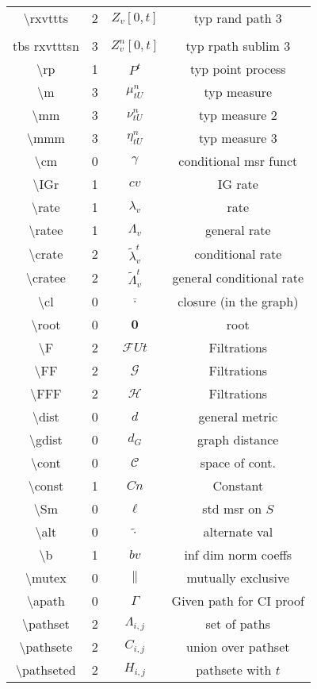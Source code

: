 \documentclass[12pt]{article}
\newcommand{\mc}{\mathcal}
\newcommand{\ov}{\overline}
\newcommand{\tbs}{\textbackslash}
\renewcommand{\root}{\mathbf{0}}				%
\renewcommand{\v}{v}							%
\renewcommand{\U}{U}							%
\renewcommand{\S}{S}							%
\renewcommand{\b}{b}							%
\renewcommand{\t}{t}							%
\newcommand{\F}{\mc{F}}							%
\newcommand{\FG}[2]{\mc{G}}						%
\newcommand{\FH}[2]{\mc{H}}						%
\newcommand{\IGr}{c}							%
\newcommand{\cl}{\ov}							%
\newcommand{\const}{C}							%
\newcommand{\gdist}{d_G}						%
\newcommand{\itt}{i}								%
\newcommand{\ittt}{j}								%
\newcommand{\rxvttts}[2]{Z_{#1}{#2}}				%
\newcommand{\rxvtttsn}[3]{Z_{#1}^{#3}{#2}}			%
\newcommand{\rp}[1]{P^{#1}}							%
\newcommand{\m}[3]{\mu_{#2#1}^{#3}}						%
\newcommand{\mm}[3]{\nu_{#2#1}^{#3}}						%
\newcommand{\mmm}[3]{\eta_{#2#1}^{#3}}						%
\newcommand{\cm}{\gamma}							%
\newcommand{\rate}[1]{\lambda_{#1}}					%
\newcommand{\ratee}[1]{\Lambda_{#1}}				%
\newcommand{\crate}[2]{\alt{\lambda}_{#1}^{#2}}		%
\newcommand{\cratee}[2]{\alt{\Lambda}_{#1}^{#2}} 	%
\newcommand{\dist}{d}								%
\newcommand{\cont}{\mc{C}}							%
\newcommand{\Sm}{\ell}								%
\newcommand{\alt}{\widetilde}						%
\newcommand{\mutex}{\|}								%
\newcommand{\apath}{\Gamma}						%
\newcommand{\pathset}[2]{\Lambda_{#1,#2}}			%
\newcommand{\pathsete}[2]{C_{#1,#2}}			%
\newcommand{\pathseted}[2]{H_{#1,#2}}			%
\begin{document}
\begin{longtable}{c|c|c|c}
\tbs rxvttts&2&\(\rxvttts{\v}{[0,\t]}\)				&typ rand path 3\\\\tbs rxvtttsn&3&\(\rxvtttsn{\v}{[0,\t]}{n}\)	&typ rpath sublim 3\\
\tbs rp&1& \(\rp{\t}\)						&typ point process\\
\tbs m&3&\(\m{\U}{\t}{n}\)						&typ measure\\
\tbs mm&3&\(\mm{\U}{\t}{n}\)						&typ measure 2\\
\tbs mmm&3&\(\mmm{\U}{\t}{n}\)						&typ measure 3\\
\tbs cm&0&\(\cm\)							&conditional msr funct\\
\tbs IGr&1&\(\IGr{\v}\)						&IG rate\\
\tbs rate&1&\(\rate{\v}\)					&rate\\
\tbs ratee&1&\(\ratee{\v}\)					&general rate\\
\tbs crate&2&\(\crate{\v}{\t}\)		&conditional rate\\
\tbs cratee&2&\(\cratee{\v}{\t}\)		&general conditional rate\\
\tbs cl&0&\(\cl{\cdot}\)			&closure (in the graph)\\
\tbs root&0&\(\root\)				&root\\
\tbs F&2&\(\F{\U}{\t}\)&Filtrations\\
\tbs FF&2&\(\FG{\U}{\t}\)&Filtrations\\
\tbs FFF&2&\(\FH{\U}{\t}\)&Filtrations\\
\tbs dist&0& \(\dist\)				&general metric\\
\tbs gdist &0& \(\gdist\)			&graph distance\\
\tbs cont &0& \(\cont\)				&space of cont. \\
\tbs const &1& \(\const{n}\)	&Constant\\
\tbs Sm&0&\(\Sm\)							&std msr on \(\S\)\\
\tbs alt&0&\(\widetilde{\cdot}\)			&alternate val\\
\tbs b&1& \(\b{\v}\)						&inf dim norm coeffs\\
\tbs mutex&0&\(\mutex\)						&mutually exclusive\\
\tbs apath&0&\(\apath\)						&Given path for CI proof\\
\tbs pathset&2&\(\pathset{\itt}{\ittt}\)	&set of paths\\
\tbs pathsete&2&\(\pathsete{\itt}{\ittt}\)	&union over pathset\\
\tbs pathseted&2&\(\pathseted{\itt}{\ittt}\)&pathsete with \(\t\)\\

\end{longtable}
\end{document}
